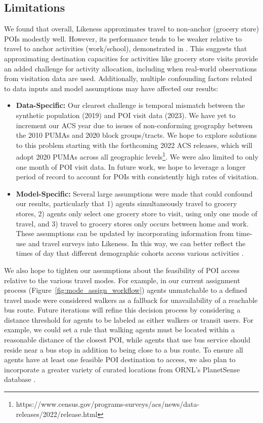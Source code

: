 \subsection{Limitations}\label{section:limitations}

We found that overall, Likeness approximates travel to non-anchor (grocery store) POIs modestly well. However, its performance tends to be weaker relative to travel to anchor activities (work/school), demonstrated in \cite{likeness-scipy-paper-2022}. This suggests that approximating destination capacities for activities like grocery store visits provide an added challenge for activity allocation, including when real-world observations from visitation data are used. Additionally, multiple confounding factors related to data inputs and model assumptions may have affected our results:

\begin{itemize}
    \item \textbf{Data-Specific:} Our clearest challenge is temporal mismatch between the synthetic population (2019) and POI visit data (2023). We have yet to increment our ACS year due to issues of non-conforming geography between the 2010 PUMAs and 2020 block groups/tracts. We hope to explore solutions to this problem starting with the forthcoming 2022 ACS releases, which will adopt 2020 PUMAs across all geographic levels\footnote{https://www.census.gov/programs-surveys/acs/news/data-releases/2022/release.html}. We were also limited to only one month of POI visit data. In future work, we hope to leverage a longer period of record to account for POIs with consistently high rates of visitation.
    \item \textbf{Model-Specific:} Several large assumptions were made that could confound our results, particularly that 1) agents simultaneously travel to grocery stores, 2) agents only select one grocery store to visit, using only one mode of travel, and 3) travel to grocery stores only occurs between home and work. These assumptions can be updated by incorporating information from time-use and travel surveys into Likeness. In this way, we can better reflect the times of day that different demographic cohorts access various activities \cite{macal2018chisim}.
\end{itemize}

We also hope to tighten our assumptions about the feasibility of POI access relative to the various travel modes. For example, in our current assignment process (Figure~\ref{fig:mode_assign_workflow}) agents unmatchable to a defined travel mode were considered walkers as a fallback for unavailability of a reachable bus route. Future iterations will refine this decision process by considering a distance threshold for agents to be labeled as either walkers or transit users. For example, we could set a rule that walking agents must be located within a reasonable distance of the closest POI, while agents that use bus service should reside near a bus stop in addition to being close to a bus route. To ensure all agents have at least one feasible POI destination to access, we also plan to incorporate a greater variety of curated locations from ORNL's PlanetSense database \cite{thakur2015planetsense}. 

